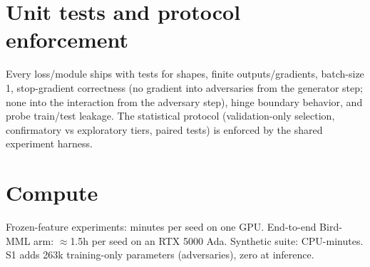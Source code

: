 \documentclass[10pt,twocolumn,letterpaper]{article}
\begin{document}
\section{Unit tests and protocol enforcement}
Every loss/module ships with tests for shapes, finite outputs/gradients, batch-size 1,
stop-gradient correctness (no gradient into adversaries from the generator step; none into the
interaction from the adversary step), hinge boundary behavior, and probe train/test leakage.
The statistical protocol (validation-only selection, confirmatory vs exploratory tiers, paired
tests) is enforced by the shared experiment harness.

\section{Compute}
Frozen-feature experiments: minutes per seed on one GPU. End-to-end Bird-MML arm: ${\approx}$1.5h
per seed on an RTX 5000 Ada. Synthetic suite: CPU-minutes. S1 adds 263k training-only parameters
(adversaries), zero at inference.
\end{document}
